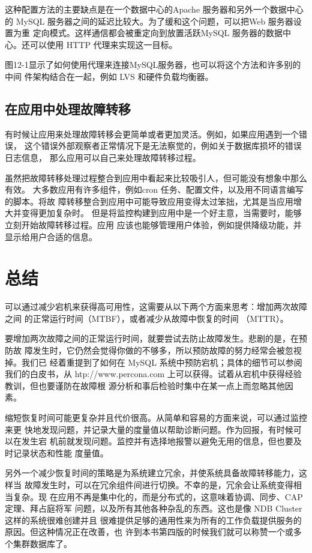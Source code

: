 这种配置方法的主要缺点是在一个数据中心的Apache 服务器和另外一个数据中心的
MySQL 服务器之间的延迟比较大。为了缓和这个问题，可以把Web 服务器设置为重
定向模式。这样通信都会被重定向到放置活跃MySQL 服务器的数据中心。还可以使用
HTTP 代理来实现这一目标。

图12-1显示了如何使用代理来连接MySQL服务器，也可以将这个方法和许多别的中间
件架构结合在一起，例如 LVS 和硬件负载均衡器。

\subsection{在应用中处理故障转移}
有时候让应用来处理故障转移会更简单或者更加灵活。例如，如果应用遇到一个错误，
这个错误外部观察者正常情况下是无法察觉的，例如关于数据库损坏的错误日志信息，
那么应用可以自己来处理故障转移过程。

虽然把故障转移处理过程整合到应用中看起来比较吸引人，但可能没有想象中那么有效。
大多数应用有许多组件，例如cron 任务、配置文件，以及用不同语言编写的脚本。将故
障转移整合到应用中可能导致应用变得太过笨拙，尤其是当应用增大并变得更加复杂时。
但是将监控构建到应用中是一个好主意，当需要时，能够立刻开始故障转移过程。应用
应该也能够管理用户体验，例如提供降级功能，并显示给用户合适的信息。

\section{总结}
可以通过减少宕机来获得高可用性，这需要从以下两个方面来思考：增加两次故障之间
的正常运行时间（MTBF），或者减少从故障中恢复的时间 （MTTR）。

要增加两次故障之间的正常运行时间，就要尝试去防止故障发生。悲剧的是，在预防故
障发生时，它仍然会觉得你做的不够多，所以预防故障的努力经常会被忽视掉。我们已
经着重提到了如何在 MySQL 系统中预防宕机；具体的细节可以参阅我们的白皮书，从
htp://www.percona.com 上可以获得。试着从宕机中获得经验教训，但也要谨防在故障根
源分析和事后检验时集中在某一点上而忽略其他因素。

缩短恢复时间可能更复杂并且代价很高。从简单和容易的方面来说，可以通过监控来更
快地发现问题，并记录大量的度量值以帮助诊断问题。作为回报，有时候可以在发生宕
机前就发现问题。监控并有选择地报警以避免无用的信息，但也要及时记录状态和性能
度量值。

另外一个减少恢复时间的策略是为系统建立冗余，并使系统具备故障转移能力，这样当
故障发生时，可以在冗余组件间进行切换。不幸的是，冗余会让系统变得相当复杂。现
在应用不再是集中化的，而是分布式的，这意味着协调、同步、CAP定理、拜占庭将军
问题，以及所有其他各种杂乱的东西。这也是像 NDB Cluster 这样的系统很难创建并且
很难提供足够的通用性来为所有的工作负载提供服务的原因。但这种情况正在改善，也
许到本书第四版的时候我们就可以称赞一个或多个集群数据库了。

